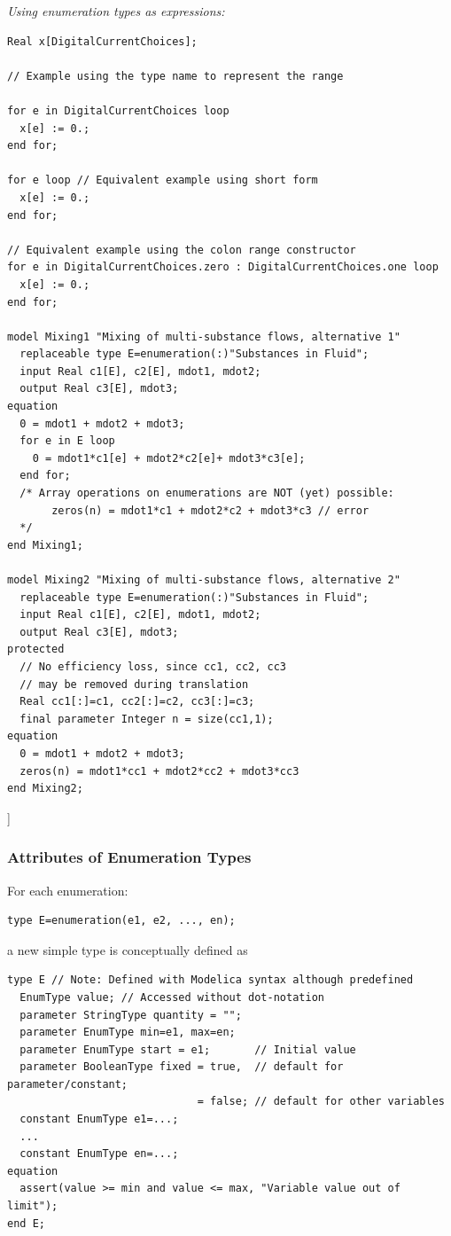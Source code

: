 \documentclass[10pt,a4paper]{report}
\def\doublelabel#1{\label{#1}\hypertarget{#1}{}}
\begin{document}
\emph{Using enumeration types as expressions:}
\begin{lstlisting}[language=Modelica]
Real x[DigitalCurrentChoices];

// Example using the type name to represent the range

for e in DigitalCurrentChoices loop
  x[e] := 0.;
end for;

for e loop // Equivalent example using short form
  x[e] := 0.;
end for;

// Equivalent example using the colon range constructor
for e in DigitalCurrentChoices.zero : DigitalCurrentChoices.one loop
  x[e] := 0.;
end for;

model Mixing1 "Mixing of multi-substance flows, alternative 1"
  replaceable type E=enumeration(:)"Substances in Fluid";
  input Real c1[E], c2[E], mdot1, mdot2;
  output Real c3[E], mdot3;
equation
  0 = mdot1 + mdot2 + mdot3;
  for e in E loop
    0 = mdot1*c1[e] + mdot2*c2[e]+ mdot3*c3[e];
  end for;
  /* Array operations on enumerations are NOT (yet) possible:
       zeros(n) = mdot1*c1 + mdot2*c2 + mdot3*c3 // error
  */
end Mixing1;

model Mixing2 "Mixing of multi-substance flows, alternative 2"
  replaceable type E=enumeration(:)"Substances in Fluid";
  input Real c1[E], c2[E], mdot1, mdot2;
  output Real c3[E], mdot3;
protected
  // No efficiency loss, since cc1, cc2, cc3
  // may be removed during translation
  Real cc1[:]=c1, cc2[:]=c2, cc3[:]=c3;
  final parameter Integer n = size(cc1,1);
equation
  0 = mdot1 + mdot2 + mdot3;
  zeros(n) = mdot1*cc1 + mdot2*cc2 + mdot3*cc3
end Mixing2;
\end{lstlisting}

{]}

\subsubsection{Attributes of Enumeration Types}\doublelabel{attributes-of-enumeration-types}

For each enumeration:
\begin{lstlisting}[language=Modelica]
type E=enumeration(e1, e2, ..., en);
\end{lstlisting}

a new simple type is conceptually defined as

\begin{lstlisting}[language=Modelica]
type E // Note: Defined with Modelica syntax although predefined
  EnumType value; // Accessed without dot-notation
  parameter StringType quantity = "";
  parameter EnumType min=e1, max=en;
  parameter EnumType start = e1;       // Initial value
  parameter BooleanType fixed = true,  // default for parameter/constant;
                              = false; // default for other variables
  constant EnumType e1=...;
  ...
  constant EnumType en=...;
equation
  assert(value >= min and value <= max, "Variable value out of limit");
end E;
\end{lstlisting}
\end{document}
